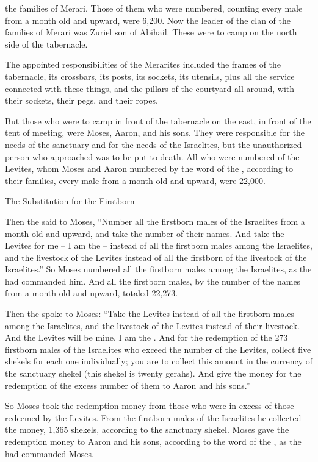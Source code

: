 {the families
of Merari.
Those of them who were numbered,
counting
every
male
from a month
old
and upward,
were 6,200.
Now the leader
of the clan
of the families
of Merari
was Zuriel
son
of Abihail.
These were to camp
on
the north
side
of the tabernacle.
\par }{\PP {}The appointed
responsibilities
of the Merarites
included the frames
of the tabernacle,
its crossbars,
its posts,
its sockets,
its utensils,
plus all
the service connected with these things,
and the pillars
of the courtyard
all around,
with their sockets,
their pegs,
and their ropes.
\par }{\PP {}But those who were to camp
in front
of the tabernacle
on the east,
in front
of the tent
of meeting,
were Moses,
Aaron,
and his sons.
They were responsible
for the needs
of the sanctuary
and for the needs
of the Israelites,
but the unauthorized
person who approached
was to be put to death.
All
who were numbered
of the Levites,
whom
Moses
and Aaron
numbered
by
the word
of the {}, according to their families,
every
male
from a month
old and upward,
were 22,000.
\par }{\SH The Substitution for the Firstborn
\par }{\PP {}Then the
{}
said to
Moses,
“Number
all
the firstborn
males
of the Israelites
from a month
old and upward,
and take
the number
of their names.
And take
the
Levites for me – I am the
{} – instead of all the firstborn males among the Israelites, and the livestock of the Levites instead of all the firstborn of the livestock of the Israelites.”
So Moses
numbered
all
the firstborn males
among the Israelites,
as
the {}
had commanded him.
And all
the firstborn
males,
by the number
of the names
from a month
old and upward,
totaled 22,273.
\par }{\PP {}Then the
{}
spoke
to
Moses:
“Take
the
Levites
instead
of all
the firstborn males
among the Israelites,
and the
livestock
of the Levites
instead
of their livestock.
And the Levites
will be
mine. I am
the {}.
And for the redemption
of the 273
firstborn males
of the Israelites
who
exceed
the number of the Levites,
collect
five
shekels
for each one individually;
you are to collect
this amount in the currency of the sanctuary
shekel
(this shekel
is twenty
gerahs).
And give
the money
for the redemption
of the excess
number of them to Aaron
and his sons.”
\par }{\PP {}So
Moses
took
the redemption
money
from those who
were in excess
of those redeemed
by the Levites.
From the firstborn males
of the Israelites
he collected
the money,
1,365
shekels,
according to the sanctuary shekel.
Moses
gave
the redemption
money
to Aaron
and his sons,
according
to the word of the
{}, as
the {}
had
commanded
Moses.


}
